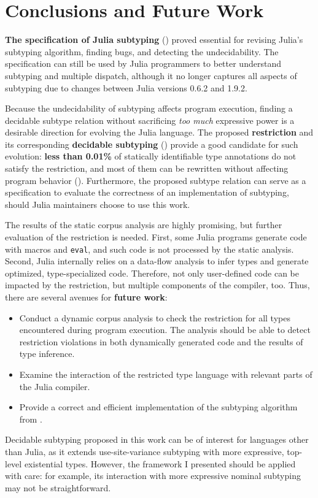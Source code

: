 \chapter{Conclusions and Future Work}

\textbf{The specification of Julia subtyping}
()
proved essential for revising Julia's subtyping algorithm, 
finding bugs, and detecting the undecidability.
The specification can still be used by Julia programmers to better understand
subtyping and multiple dispatch, although it no longer captures all aspects of 
subtyping due to changes between Julia versions 0.6.2 and 1.9.2.

Because the undecidability of subtyping affects program execution,
finding a decidable subtype relation without sacrificing \emph{too much}
expressive power is a desirable direction for evolving the Julia language.
The proposed \textbf{restriction} and its corresponding 
\textbf{decidable subtyping} ()
provide a good candidate for such evolution: 
\textbf{less than 0.01\%} of statically
identifiable type annotations do not satisfy the restriction, and most of them
can be rewritten without affecting program behavior
().
Furthermore, the proposed subtype relation can serve as a specification
to evaluate the correctness of an implementation of subtyping,
should Julia maintainers choose to use this work.

The results of the static corpus analysis are highly promising,
but further evaluation of the restriction is needed. 
First, some Julia programs generate code with macros and \texttt{eval},
and such code is not processed by the static analysis.
Second, Julia internally relies on a data-flow analysis
to infer types and generate optimized, type-specialized code. Therefore,
not only user-defined code can be impacted by the restriction, but multiple 
components of the compiler, too. 
Thus, there are several avenues for \textbf{future work}:
\begin{itemize}
    \item Conduct a dynamic corpus analysis to check the restriction for all
        types encountered during program execution. The analysis should be able
        to detect restriction violations in both dynamically generated code
        and the results of type inference.
    \item Examine the interaction of the restricted type language 
        with relevant parts of the Julia compiler.
    \item Provide a correct and efficient implementation of the subtyping
        algorithm from .
\end{itemize}

Decidable subtyping proposed in this work can be of interest for
languages other than Julia, as it extends use-site-variance subtyping 
with more expressive, top-level existential types.
However, the framework I presented should be applied with care:
for example, its interaction with more expressive nominal subtyping
may not be straightforward.
